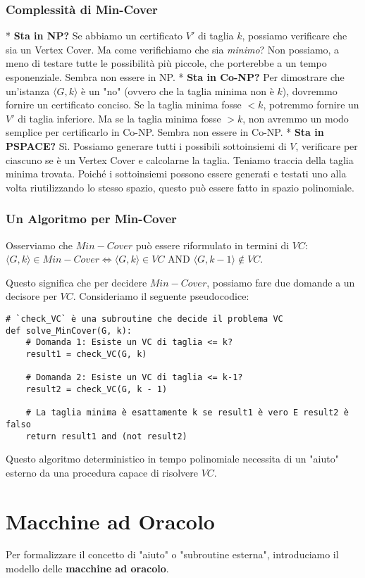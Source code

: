 \documentclass[a4paper]{article}
\begin{document}
\subsubsection{Complessità di Min-Cover}
*   \textbf{Sta in NP?} Se abbiamo un certificato $V'$ di taglia $k$, possiamo verificare che sia un Vertex Cover. Ma come verifichiamo che sia \emph{minimo}? Non possiamo, a meno di testare tutte le possibilità più piccole, che porterebbe a un tempo esponenziale. Sembra non essere in NP.
*   \textbf{Sta in Co-NP?} Per dimostrare che un'istanza $\langle G,k \rangle$ è un "no" (ovvero che la taglia minima non è $k$), dovremmo fornire un certificato conciso. Se la taglia minima fosse $< k$, potremmo fornire un $V'$ di taglia inferiore. Ma se la taglia minima fosse $> k$, non avremmo un modo semplice per certificarlo in Co-NP. Sembra non essere in Co-NP.
*   \textbf{Sta in PSPACE?} Sì. Possiamo generare tutti i possibili sottoinsiemi di $V$, verificare per ciascuno se è un Vertex Cover e calcolarne la taglia. Teniamo traccia della taglia minima trovata. Poiché i sottoinsiemi possono essere generati e testati uno alla volta riutilizzando lo stesso spazio, questo può essere fatto in spazio polinomiale.

\subsubsection{Un Algoritmo per Min-Cover}
Osserviamo che $Min-Cover$ può essere riformulato in termini di $VC$:
$\langle G, k \rangle \in Min-Cover \iff \langle G, k \rangle \in VC \text{ AND } \langle G, k-1 \rangle \notin VC$.

Questo significa che per decidere $Min-Cover$, possiamo fare due domande a un decisore per $VC$.
Consideriamo il seguente pseudocodice:
\begin{verbatim}
# `check_VC` è una subroutine che decide il problema VC
def solve_MinCover(G, k):
    # Domanda 1: Esiste un VC di taglia <= k?
    result1 = check_VC(G, k)

    # Domanda 2: Esiste un VC di taglia <= k-1?
    result2 = check_VC(G, k - 1)

    # La taglia minima è esattamente k se result1 è vero E result2 è falso
    return result1 and (not result2)
\end{verbatim}
Questo algoritmo deterministico in tempo polinomiale necessita di un "aiuto" esterno da una procedura capace di risolvere $VC$.

\section{Macchine ad Oracolo}
Per formalizzare il concetto di "aiuto" o "subroutine esterna", introduciamo il modello delle \textbf{macchine ad oracolo}.
\end{document}
